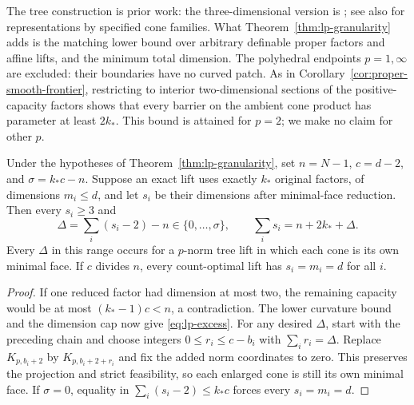The tree construction is prior work: the three-dimensional version is
\citet[Proposition~1]{KrokhmalSoberanis2010}; see also
\citet{BlancoMartinezAnton2024} for representations by specified cone
families. What Theorem~\ref{thm:lp-granularity} adds is the matching
lower bound over arbitrary definable proper factors and affine lifts,
and the minimum total dimension. The polyhedral endpoints $p=1,\infty$
are excluded: their boundaries have no curved patch. As in
Corollary~\ref{cor:proper-smooth-frontier}, restricting to interior
two-dimensional sections of the positive-capacity factors shows that
every barrier on the ambient cone product has parameter at least $2k_*$.
This bound is attained for $p=2$; we make no claim for other $p$.

\begin{proposition}
\label{prop:lp-capacity-excess}
Under the hypotheses of Theorem~\ref{thm:lp-granularity}, set $n=N-1$,
$c=d-2$, and $\sigma=k_*c-n$. Suppose an exact lift uses
exactly $k_*$ original factors, of dimensions $m_i\leq d$, and let $s_i$
be their dimensions after minimal-face reduction. Then every $s_i\geq3$
and
\begin{equation}\label{eq:lp-excess}
 \Delta=\sum_i(s_i-2)-n\in\{0,\ldots,\sigma\},\qquad
 \sum_i s_i=n+2k_*+\Delta.
\end{equation}
Every $\Delta$ in this range occurs for a $p$-norm tree lift in which
each cone is its own minimal face.
If $c$ divides $n$, every count-optimal lift has $s_i=m_i=d$ for all $i$.
\end{proposition}
\begin{proof}
If one reduced factor had dimension at most two, the remaining capacity
would be at most $(k_*-1)c<n$, a contradiction. The lower curvature
bound and the dimension cap now give \eqref{eq:lp-excess}. For any desired
$\Delta$, start with the preceding chain and choose integers
$0\leq r_i\leq c-b_i$ with $\sum_i r_i=\Delta$. Replace
$K_{p,b_i+2}$ by $K_{p,b_i+2+r_i}$ and fix the added norm coordinates
to zero. This preserves the projection and strict feasibility, so each
enlarged cone is still its own minimal face. If $\sigma=0$,
equality in $\sum_i(s_i-2)\leq k_*c$ forces every $s_i=m_i=d$.
\end{proof}

